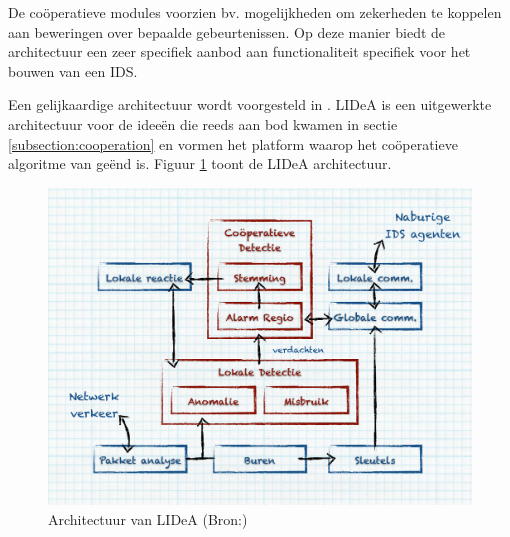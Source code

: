 De co\"operatieve modules voorzien bv. mogelijkheden om zekerheden te koppelen
aan beweringen over bepaalde gebeurtenissen. Op deze manier biedt de
architectuur een zeer specifiek aanbod aan functionaliteit specifiek voor het
bouwen van een IDS.

Een gelijkaardige architectuur wordt voorgesteld in \citep{krontiris2008lidea}.
LIDeA is een uitgewerkte architectuur voor de idee\"en die reeds aan bod kwamen
in sectie \ref{subsection:cooperation} en vormen het platform waarop het
co\"operatieve algoritme van \citep{krontiris2009cooperative} ge\"end is. Figuur
\ref{fig:lidea-architecture} toont de LIDeA architectuur.

\begin{figure}[ht]
  \centering
  \includegraphics[width=0.9\linewidth]{resources/lidea-architecture.pdf}
  \caption[Architectuur van LIDeA]{Architectuur van LIDeA (Bron:\citep{krontiris2008lidea})}
  \label{fig:lidea-architecture}
\end{figure}
